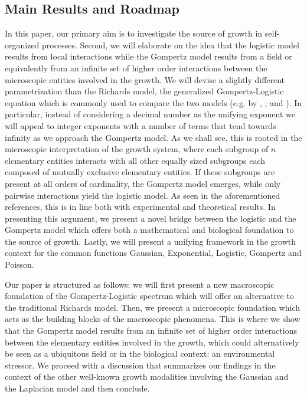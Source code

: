 \documentclass{article}
\begin{document}
\subsection{Main Results and Roadmap}
In this paper, our primary aim is to investigate the source of growth in self-organized processes. Second, we will elaborate on the idea that the logistic model results from local interactions while the Gompertz model results from a field or equivalently from an infinite set of higher order interactions between the microscopic entities involved in the growth. We will devise a slightly different parametrization than the Richards model, the generalized Gompertz-Logistic equation which is commonly used to compare the two models (e.g. by \citet{petroni2020logistic}, \citet{tjorve2017use}, and \citet{wang2012richards}). In particular, instead of considering a decimal number as the unifying exponent we will appeal to integer exponents with a number of terms that tend towards infinity as we approach the Gompertz model. As we shall see, this is rooted in the microscopic interpretation of the growth system, where each subgroup of $n$ elementary entities interacts with all other equally sized subgroups each composed of mutually exclusive elementary entities. If these subgroups are present at all orders of cardinality, the Gompertz model emerges, while only pairwise interactions yield the logistic model. As seen in the aforementioned references, this is in line both with experimental and theoretical results. In presenting this argument, we present a novel bridge between the logistic and the Gompertz model which offers both a mathematical and biological foundation to the source of growth. Lastly, we will present a unifying framework in the growth context for the common functions Gaussian, Exponential, Logistic, Gompertz and Poisson.

Our paper is structured as follows: we will first present a new macroscopic foundation of the Gompertz-Logistic spectrum which will offer an alternative to the traditional Richards model. Then, we present a microscopic foundation which acts as the building blocks of the macroscopic phenomena. This is where we show that the Gompertz model results from an infinite set of higher order interactions between the elementary entities involved in the growth, which could alternatively be seen as a ubiquitous field or in the biological context: an environmental stressor. We proceed with a discussion that summarizes our findings in the context of the other well-known growth modalities involving the Gaussian and the Laplacian model and then conclude.
\end{document}
